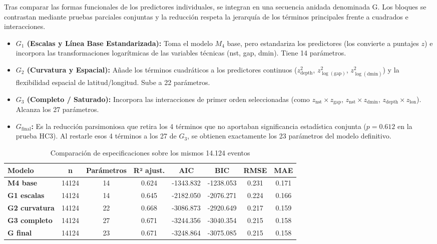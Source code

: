 \documentclass{style}
\begin{document}
Tras comparar las formas funcionales de los predictores individuales, se integran en una secuencia anidada denominada G. Los bloques se contrastan mediante pruebas parciales conjuntas y la reducción respeta la jerarquía de los términos principales frente a cuadrados e interacciones.


\begin{itemize}
    \item \textbf{$G_1$ (Escalas y Línea Base Estandarizada):} Toma el modelo \textbf{$M_4$} base, pero estandariza los predictores (los convierte a puntajes $z$) e incorpora las transformaciones logarítmicas de las variables técnicas (nst, gap, dmin). Tiene 14 parámetros.

    \item \textbf{$G_2$ (Curvatura y Espacial):} Añade los términos cuadráticos a los predictores continuos ($z_{\text{depth}}^2$, $z_{\log(\text{gap})}^2$, $z_{\log(\text{dmin})}^2$) y la flexibilidad espacial de latitud/longitud. Sube a 22 parámetros.

    \item \textbf{$G_3$ (Completo / Saturado):} Incorpora las interacciones de primer orden seleccionadas (como $z_{\text{nst}} \times z_{\text{gap}}$, $z_{\text{nst}} \times z_{\text{dmin}}$, $z_{\text{depth}} \times z_{\text{lon}}$). Alcanza los 27 parámetros.

    \item \textbf{$G_{\text{final}}$:} Es la reducción parsimoniosa que retira los 4 términos que no aportaban significancia estadística conjunta ($p = 0.612$ en la prueba HC3). Al restarle esos 4 términos a los 27 de \textbf{$G_3$}, se obtienen exactamente los 23 parámetros del modelo definitivo.
\end{itemize}

\begin{table}[H]
    \centering
    \caption{Comparación de especificaciones sobre los mismos 14.124 eventos}
    \scriptsize
    \setlength{\tabcolsep}{12pt} 
    \begin{tabular}{lccccccc}
    \toprule
    \textbf{Modelo} & \textbf{n} & \textbf{Parámetros} & \textbf{R² ajust.} & \textbf{AIC} & \textbf{BIC} & \textbf{RMSE} & \textbf{MAE} \\
    \midrule
    \textbf{M4 base} & 14124 & 14 & 0.624 & -1343.832 & -1238.053 & 0.231 & 0.171 \\
    \textbf{G1 escalas} & 14124 & 14 & 0.645 & -2182.050 & -2076.271 & 0.224 & 0.166 \\
    \textbf{G2 curvatura} & 14124 & 22 & 0.668 & -3086.873 & -2920.649 & 0.217 & 0.159 \\
    \textbf{G3 completo} & 14124 & 27 & 0.671 & -3244.356 & -3040.354 & 0.215 & 0.158 \\
    \textbf{G final} & 14124 & 23 & 0.671 & -3248.864 & -3075.085 & 0.215 & 0.158 \\
    \bottomrule
    \end{tabular}
\end{table}
\end{document}
